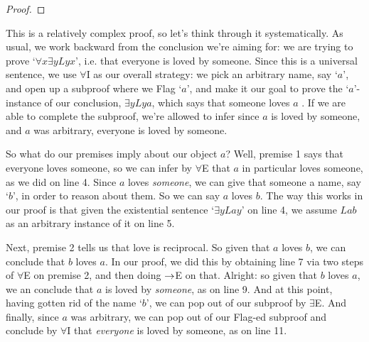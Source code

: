 \begin{proof}
 
  
\open
	 
	 
	\open
		  
		 
		 
		 
		 
	\close
	 
\close
{} 
\end{proof}
This is a relatively complex proof, so let's think through it systematically.  As usual, we work backward from the conclusion we're aiming for: we are trying to prove `$\forall x\exists yLyx$', i.e. that everyone is loved by someone.  Since this is a universal sentence, we use $\forall$I as our overall strategy: we pick an arbitrary name, say `$a$', and open up a subproof where we Flag `$a$', and make it our goal to prove the `$a$'-instance of our conclusion, $\exists yLya$, which says that someone loves $a$ .  If we are able to complete the subproof, we're allowed to infer since $a$ is loved by someone, and $a$ was arbitrary, everyone is loved by someone.

So what do our premises imply about our object $a$?  Well, premise 1 says that everyone loves someone, so we can infer by $\forall$E that $a$ in particular loves someone, as we did on line 4.  Since $a$ loves \emph{someone}, we can give that someone a name, say `$b$', in order to reason about them.  So we can say $a$ loves $b$.  The way this works in our proof is that given the existential sentence `$\exists yLay$' on line 4, we assume $Lab$ as an arbitrary instance of it on line 5.

Next, premise 2 tells us that love is reciprocal.  So given that $a$ loves $b$, we can conclude that $b$ loves $a$.  In our proof, we did this by obtaining line 7 via two steps of $\forall$E on premise 2, and then doing $\rightarrow$E on that.  Alright: so given that $b$ loves $a$, we an conclude that $a$ is loved by \emph{someone}, as on line 9. And at this point, having gotten rid of the name `$b$', we can pop out of our subproof by $\exists$E.  And finally, since $a$ was arbitrary, we can pop out of our Flag-ed subproof and conclude by $\forall$I that \emph{everyone} is loved by someone, as on line 11.


